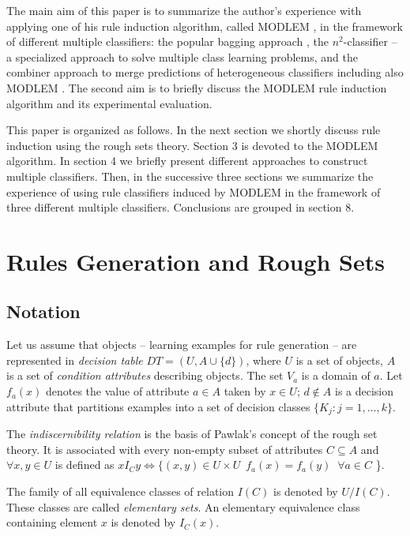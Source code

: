 \documentclass{llncs}
\begin{document}
The main aim of this paper is to summarize the author's experience with
applying one of his rule induction algorithm, called MODLEM \cite{modlem},
in the framework of different multiple classifiers: the popular bagging
approach \cite{Bre}, the $n^2$-classifier \cite{JelStef98} -- a specialized
approach to solve multiple class learning problems, and the combiner
approach to merge predictions of heterogeneous classifiers including also
MODLEM \cite{ChanStolfo97}. The second aim is to briefly discuss the MODLEM
rule induction algorithm and its experimental evaluation.

This paper is organized as follows. In the next section we shortly discuss
rule induction using the rough sets theory. Section 3 is devoted to the
MODLEM algorithm. In section 4 we briefly present different approaches to
construct multiple classifiers. Then, in the successive three sections we
summarize the experience of using rule classifiers induced by MODLEM in the
framework of three different multiple classifiers. Conclusions are grouped
in section 8.

\section{Rules Generation and Rough Sets}

\subsection{Notation}

Let us assume that objects -- learning examples for rule generation -- are
represented in {\em decision table} $DT=(U,A \cup \{d\})$, where $U$ is a
set of objects, $A$ is a set of {\it condition attributes} describing
objects. The set $V_a$ is a domain of $a$. Let $f_a(x)$ denotes the value of
attribute $a \in A$ taken by $x \in U$; $d \notin A$ is a decision attribute
that partitions examples into a set of decision classes  $\{K_j:
j=1,\ldots,k\}$.

The {\em indiscernibility relation} is the basis of Pawlak's concept of the
rough set theory. It  is associated with every non-empty subset of
attributes $ C \subseteq A$ and $\forall x,y \in U$ is defined as $ xI_{C}y
\Leftrightarrow  \{ (x,y) \in U \times U \; \: f_{a}(x)=f_{a}(y) \;
\;\forall a \in C$ \}.

The family of all equivalence classes of relation $I(C)$ is denoted by
$U/I(C)$. These classes are called {\em elementary sets}. An elementary
equivalence class containing element $x$ is denoted by $I_{C}(x)$.
\end{document}
